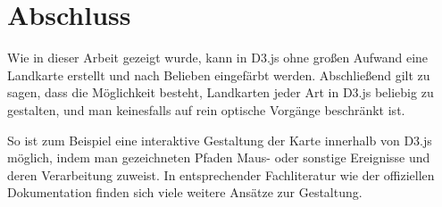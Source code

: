
\chapter{Abschluss}
\label{ch:conclusion}

Wie in dieser Arbeit gezeigt wurde, kann in D3.js ohne großen Aufwand eine Landkarte erstellt und nach Belieben eingefärbt werden. Abschließend gilt zu sagen, dass die Möglichkeit besteht, Landkarten jeder Art in D3.js beliebig zu gestalten, und man keinesfalls auf rein optische Vorgänge beschränkt ist. 

So ist zum Beispiel eine interaktive Gestaltung der Karte innerhalb von D3.js möglich, indem man gezeichneten Pfaden Maus- oder sonstige Ereignisse und deren Verarbeitung zuweist. In entsprechender Fachliteratur wie der offiziellen Dokumentation finden sich viele weitere Ansätze zur Gestaltung.